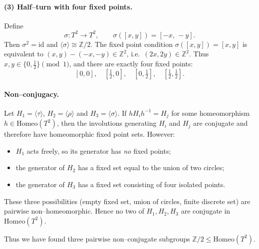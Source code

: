 \documentclass[12pt,a4paper]{article}
\theoremstyle{plain}
\theoremstyle{definition}      %
\begin{document}
\paragraph{(3) Half--turn with four fixed points.}
Define
\[
\sigma:T^{2}\to T^{2}, \qquad \sigma([x,y]) = [-x,\,-y].
\]
Then $\sigma^{2}=\mathrm{id}$ and $\langle\sigma\rangle\cong\mathbb{Z}/2$.
The fixed point condition $\sigma([x,y])=[x,y]$ is equivalent to
$(x,y)-(-x,-y)\in\mathbb{Z}^{2}$, i.e.\ $(2x,2y)\in\mathbb{Z}^{2}$.
Thus $x,y\in\{0,\tfrac12\}\pmod{1}$, and there are exactly four fixed
points:
\[
[0,0],\quad [\tfrac12,0],\quad [0,\tfrac12],\quad
[\tfrac12,\tfrac12].
\]

\paragraph{Non--conjugacy.}
Let $H_{1}=\langle\tau\rangle$, $H_{2}=\langle\rho\rangle$ and
$H_{3}=\langle\sigma\rangle$.
If $hH_{i}h^{-1} = H_{j}$ for some homeomorphism $h\in\mathrm{Homeo}(T^{2})$,
then the involutions generating $H_{i}$ and $H_{j}$ are conjugate and
therefore have homeomorphic fixed point sets.
However:
\begin{itemize}
	\item $H_{1}$ acts freely, so its generator has \emph{no} fixed points;
	\item the generator of $H_{2}$ has a fixed set equal to the union of
	two circles;
	\item the generator of $H_{3}$ has a fixed set consisting of four
	isolated points.
\end{itemize}
These three possibilities (empty fixed set, union of circles,
finite discrete set) are pairwise non--homeomorphic.  Hence no two of
$H_{1},H_{2},H_{3}$ are conjugate in $\mathrm{Homeo}(T^{2})$.

Thus we have found three pairwise non--conjugate subgroups
$\mathbb{Z}/2 \le \mathrm{Homeo}(T^{2})$.
\end{document}
